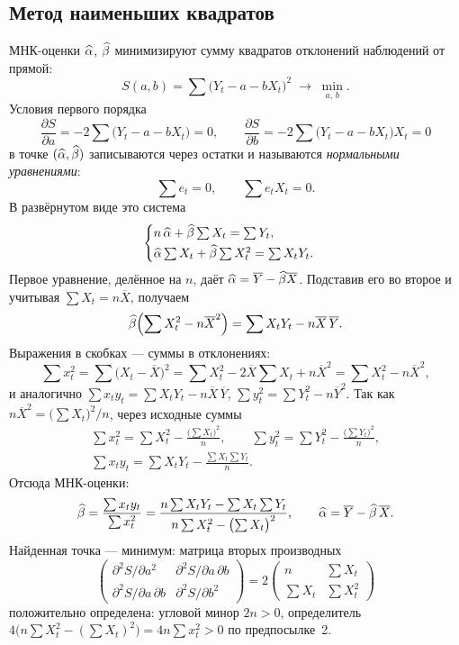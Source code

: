 \subsection{Метод наименьших квадратов}\label{sec:ols}

МНК-оценки $\widehat{\alpha}$, $\widehat{\beta}$ минимизируют сумму квадратов отклонений наблюдений от
прямой:
\[
  S(a,b) = \sum\bigl(Y_t - a - bX_t\bigr)^2 \;\longrightarrow\; \min_{a,\,b}.
\]
Условия первого порядка
\[
  \frac{\partial S}{\partial a} = -2\sum\bigl(Y_t - a - bX_t\bigr) = 0,
  \qquad
  \frac{\partial S}{\partial b} = -2\sum\bigl(Y_t - a - bX_t\bigr)X_t = 0
\]
в точке $(\widehat{\alpha}, \widehat{\beta})$ записываются через остатки и называются
\emph{нормальными уравнениями}:
\begin{equation}
  \sum e_t = 0, \qquad \sum e_tX_t = 0 .
  \label{eq:normal}
\end{equation}
В развёрнутом виде это система
\[
  \begin{cases}
    n\,\widehat{\alpha} + \widehat{\beta}\sum X_t = \sum Y_t, \\[2pt]
    \widehat{\alpha}\sum X_t + \widehat{\beta}\sum X_t^2 = \sum X_tY_t .
  \end{cases}
\]
Первое уравнение, делённое на $n$, даёт $\widehat{\alpha} = \overline{Y} - \widehat{\beta}\overline{X}$.
Подставив его во второе и учитывая $\sum X_t = n\overline{X}$, получаем
\[
  \widehat{\beta}\Bigl(\sum X_t^2 - n\overline{X}^2\Bigr)
  = \sum X_tY_t - n\overline{X}\,\overline{Y}.
\]
Выражения в скобках — суммы в отклонениях:
\[
  \sum x_t^2 = \sum\bigl(X_t - \overline{X}\bigr)^2
  = \sum X_t^2 - 2\overline{X}\sum X_t + n\overline{X}^2
  = \sum X_t^2 - n\overline{X}^2,
\]
и аналогично $\sum x_ty_t = \sum X_tY_t - n\overline{X}\,\overline{Y}$,
$\sum y_t^2 = \sum Y_t^2 - n\overline{Y}^2$. Так как
$n\overline{X}^2 = \bigl(\sum X_t\bigr)^2/n$, через исходные суммы
\begin{equation}
\begin{gathered}
  \sum x_t^2 = \sum X_t^2 - \frac{\bigl(\sum X_t\bigr)^2}{n},
  \qquad
  \sum y_t^2 = \sum Y_t^2 - \frac{\bigl(\sum Y_t\bigr)^2}{n},
  \\[4pt]
  \sum x_ty_t = \sum X_tY_t - \frac{\sum X_t\sum Y_t}{n}.
\end{gathered}
\label{eq:dev-sums}
\end{equation}
Отсюда МНК-оценки:
\begin{equation}
  \widehat{\beta} = \frac{\sum x_ty_t}{\sum x_t^2}
      = \frac{n\sum X_tY_t - \sum X_t\sum Y_t}{n\sum X_t^2 - \bigl(\sum X_t\bigr)^2},
  \qquad
  \widehat{\alpha} = \overline{Y} - \widehat{\beta}\,\overline{X}.
  \label{eq:ols}
\end{equation}
Найденная точка — минимум: матрица вторых производных
\[
  \begin{pmatrix}
    \partial^2S/\partial a^2 & \partial^2S/\partial a\,\partial b \\
    \partial^2S/\partial a\,\partial b & \partial^2S/\partial b^2
  \end{pmatrix}
  = 2\begin{pmatrix} n & \sum X_t \\ \sum X_t & \sum X_t^2 \end{pmatrix}
\]
положительно определена: угловой минор $2n > 0$, определитель
$4\bigl(n\sum X_t^2 - (\sum X_t)^2\bigr) = 4n\sum x_t^2 > 0$ по предпосылке~2.

